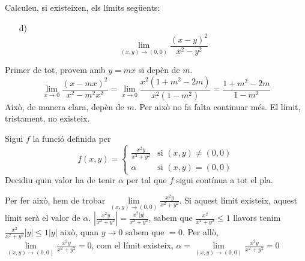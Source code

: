 \documentclass[a4paper, 12pt]{article}
\begin{document}
    \setcounter{numex}{10}
    \begin{exercici}
        Calculeu, si existeixen, els límits següents:
        \begin{itemize}
            \item[d)]
            \begin{displaymath}
                \lim\limits_{\left(x,y\right)\rightarrow\left(0,0\right) } \frac{\left(x-y\right)^2}{x^2-y^2}
            \end{displaymath}
        \end{itemize}
    \end{exercici}
    \begin{solucio}
        Primer de tot, provem amb $y = mx$ si depèn de $m$.
        \begin{displaymath}
            \lim\limits_{x\to0} \frac{\left(x-mx\right)^2}{x^2-m^2x^2} = \lim\limits_{x\to0} \frac{x^2\left(1+m^2-2m\right) }{x^2\left(1-m^2\right)} = \frac{1+m^2-2m}{1-m^2}
        \end{displaymath}
        Això, de manera clara, depèn de $m$. Per això no fa falta continuar més. El límit,
        tristament, no existeix.
    \end{solucio}

    \begin{exercici}
        Sigui $f$ la funció definida per
        \begin{displaymath}
            f\left(x,y\right) = 
            \begin{cases}
                \frac{x^2y}{x^2+y^2} & \text{si } \left(x,y\right)  \neq \left(0,0\right)\\
                \alpha & \text{si } \left(x,y\right)  = \left(0,0\right)
            \end{cases} 
        \end{displaymath}
        Decidiu quin valor ha de tenir $\alpha$ per tal que $f$ sigui contínua a tot el pla.
    \end{exercici}
    \begin{solucio}
        Per fer això, hem de trobar $\lim\limits_{\left(x,y\right)\to\left(0,0\right)}\frac{x^2y}{x^2+y^2}$.
        Si aquest límit existeix, aquest límit serà el valor de $\alpha$.
        $\left\lvert \frac{x^2y}{x^2+y^2}\right\rvert = \frac{x^2\left\lvert y\right\rvert}{x^2+y^2}$, sabem que $\frac{x^2}{x^2+y^2} \leq 1$
        llavors tenim $\frac{x^2}{x^2+y^2}\left\lvert y\right\rvert \leq 1\left\lvert y\right\rvert$
        això, quan $y \to 0$ sabem que $=0$. Per allò, $\lim\limits_{\left(x,y\right)\to\left(0,0\right)}\frac{x^2y}{x^2+y^2} = 0$,
        com el límit existeix, $\boxed{\alpha = \lim\limits_{\left(x,y\right)\to\left(0,0\right)}\frac{x^2y}{x^2+y^2} = 0}$
    \end{solucio}
\end{document}
